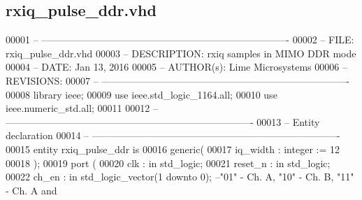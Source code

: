 \subsection{rxiq\+\_\+pulse\+\_\+ddr.\+vhd}
\label{rxiq__pulse__ddr_8vhd_source}

\begin{DoxyCode}
00001 \textcolor{keyword}{-- ---------------------------------------------------------------------------- }
00002 \textcolor{keyword}{-- FILE:    rxiq\_pulse\_ddr.vhd}
00003 \textcolor{keyword}{-- DESCRIPTION: rxiq samples in MIMO DDR mode}
00004 \textcolor{keyword}{-- DATE:    Jan 13, 2016}
00005 \textcolor{keyword}{-- AUTHOR(s):   Lime Microsystems}
00006 \textcolor{keyword}{-- REVISIONS:}
00007 \textcolor{keyword}{-- ---------------------------------------------------------------------------- }
00008 \textcolor{vhdlkeyword}{library }\textcolor{keywordflow}{ieee};
00009 \textcolor{vhdlkeyword}{use }ieee.std\_logic\_1164.\textcolor{keywordflow}{all};
00010 \textcolor{vhdlkeyword}{use }ieee.numeric\_std.\textcolor{keywordflow}{all};
00011 
00012 \textcolor{keyword}{-- ----------------------------------------------------------------------------}
00013 \textcolor{keyword}{-- Entity declaration}
00014 \textcolor{keyword}{-- ----------------------------------------------------------------------------}
00015 \textcolor{keywordflow}{entity }rxiq_pulse_ddr \textcolor{keywordflow}{is}
00016    \textcolor{keywordflow}{generic}\textcolor{vhdlchar}{(}
00017       \textcolor{vhdlchar}{iq_width}      \textcolor{vhdlchar}{:} \textcolor{comment}{integer} \textcolor{vhdlchar}{:=} \textcolor{vhdllogic}{}\textcolor{vhdllogic}{12}
00018    \textcolor{vhdlchar}{)};
00019   \textcolor{keywordflow}{port} \textcolor{vhdlchar}{(}
00020       \textcolor{vhdlchar}{clk}         \textcolor{vhdlchar}{:} \textcolor{keywordflow}{in} \textcolor{comment}{std\_logic};
00021       \textcolor{vhdlchar}{reset_n}     \textcolor{vhdlchar}{:} \textcolor{keywordflow}{in} \textcolor{comment}{std\_logic};
00022         \textcolor{vhdlchar}{ch_en}           \textcolor{vhdlchar}{:} \textcolor{keywordflow}{in} \textcolor{comment}{std\_logic\_vector}\textcolor{vhdlchar}{(}\textcolor{vhdllogic}{}\textcolor{vhdllogic}{1} \textcolor{keywordflow}{downto} \textcolor{vhdllogic}{}\textcolor{vhdllogic}{0}\textcolor{vhdlchar}{)};\textcolor{keyword}{ --"01" - Ch. A, "10" - Ch. B, "11" - Ch. A and
}
\end{DoxyCode}
